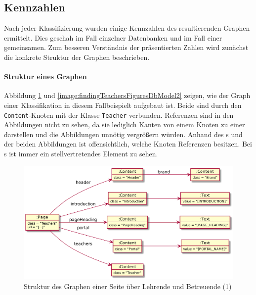 \subsection{Kennzahlen}
    Nach jeder Klassifizierung wurden einige Kennzahlen des
    resultierenden Graphen ermittelt.
    Dies geschah im Fall einzelner Datenbanken und im Fall
    einer gemeinsamen.
    Zum besseren Verständnis der präsentierten Zahlen wird
    zunächst die konkrete Struktur der Graphen beschrieben.

    \paragraph{Struktur eines Graphen}
    Abbildung \ref{image:findingTeachersFiguresDbModel1}
    und \ref{image:findingTeachersFiguresDbModel2} zeigen,
    wie der Graph einer Klassifikation in diesem Fallbeispielt aufgebaut ist.
    Beide sind durch den \texttt{Content}-Knoten mit der Klasse \texttt{Teacher} verbunden.
    Referenzen sind in den Abbildungen nicht zu sehen,
    da sie lediglich Kanten von einem Knoten zu einer {\resource} darstellen
    und die Abbildungen unnötig vergrößern würden.
    Anhand des {\classificationModel}s und der beiden Abbildungen ist
    offensichtlich, welche Knoten Referenzen besitzen.
    Bei {\collectionFeature}s ist immer ein stellvertretendes Element zu sehen.

    \begin{figure}[htb]
        \centering
        \includegraphics[scale=\imageScalingFactor]{../resources/findings/case-study-1/dbmodel/dbmodel1.png}
        \caption{Struktur des Graphen einer Seite über Lehrende und Betreuende (1)}
        \label{image:findingTeachersFiguresDbModel1}
    \end{figure}

